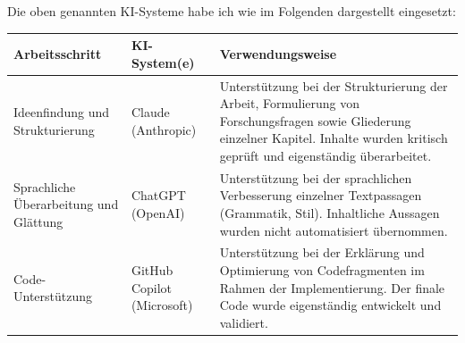 {\clearpage

Die oben genannten KI-Systeme habe ich wie im Folgenden dargestellt eingesetzt: 

\begin{tabular}{|p{3.5cm}|p{4.3cm}|p{6.2cm}|}
\hline
\textbf{Arbeitsschritt} & \textbf{KI-System(e)} & \textbf{Verwendungsweise} \\
\hline

Ideenfindung und Strukturierung &
Claude (Anthropic) &
Unterstützung bei der Strukturierung der Arbeit, Formulierung von Forschungsfragen sowie Gliederung einzelner Kapitel. Inhalte wurden kritisch geprüft und eigenständig überarbeitet. \\
\hline

Sprachliche Überarbeitung und Glättung &
ChatGPT (OpenAI) &
Unterstützung bei der sprachlichen Verbesserung einzelner Textpassagen (Grammatik, Stil). Inhaltliche Aussagen wurden nicht automatisiert übernommen. \\
\hline

Code-Unterstützung &
GitHub Copilot (Microsoft) &
Unterstützung bei der Erklärung und Optimierung von Codefragmenten im Rahmen der Implementierung. Der finale Code wurde eigenständig entwickelt und validiert. \\
\hline

\end{tabular}
} %

